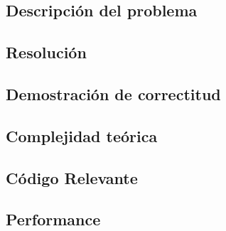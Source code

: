 \subsection{Descripci\'on del problema}

\newpage

\subsection{Resoluci\'on}

\newpage

\subsection{Demostraci\'on de correctitud}

\newpage

\subsection{Complejidad te\'orica}

\newpage

\subsection{C\'odigo Relevante}

\newpage

\subsection{Performance}

\newpage